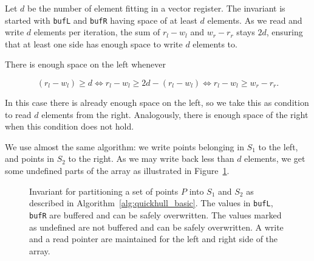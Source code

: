 Let $d$ be the number of element fitting in a vector register. The invariant
is started with \texttt{bufL} and \texttt{bufR} having space of at least
$d$ elements. As we read and write $d$ elements per iteration, the sum
of $r_l - w_l$ and $w_r - r_r$ stays $2d$, ensuring that at least one side
has enough space to write $d$ elements to.

There is enough space on the left whenever

\begin{equation}
(r_l - w_l) \geq d \iff r_l - w_l \geq 2d - (r_l - w_l) \iff r_l - w_l \geq w_r - r_r.
\label{eq:bramas}
\end{equation}

In this case there is already enough space on the left, so we take this as
condition to read $d$ elements from the right. Analogously, there is enough
space of the right when this condition does not hold.

We use almost the same algorithm: we write points belonging in $S_1$ to the
left, and points in $S_2$ to the right. As we may write back less than
$d$ elements, we get some undefined parts of the array as illustrated in
Figure~\ref{fig:invariant_qhull}.

\begin{figure}[ht]
    \caption{Invariant for partitioning a set of points $P$ into 
             $S_1$ and $S_2$ as described in 
             Algorithm~\ref{alg:quickhull_basic}. 
             The values in \texttt{bufL}, \texttt{bufR}
             are buffered and can be safely overwritten. The values marked
             as undefined are not buffered and can be safely overwritten.
             A write and a read pointer are maintained for
             the left and right side of the array.}
    \label{fig:invariant_qhull}
\end{figure}

